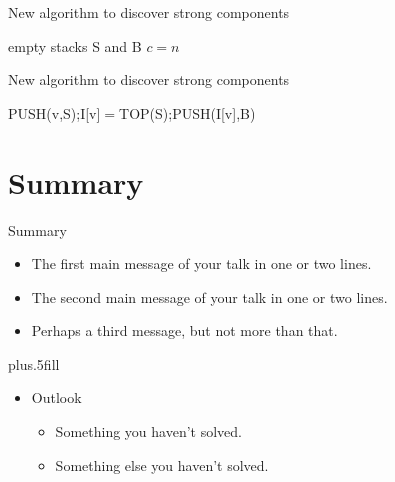\documentclass{beamer}
\begin{document}
\begin{frame}[fragile]{New algorithm to discover strong components}
	\begin{procedure}[H]
		\small
		\caption{STRONG(G)}
		empty stacks S and B\;
		$c=n$\;
	\end{procedure}
\end{frame}

\begin{frame}[fragile]{New algorithm to discover strong components}
	\begin{procedure}[H]
		\scriptsize
		\caption{DFS(v)}
		PUSH(v,S);\quad I[v]$=$TOP(S);\quad PUSH(I[v],B)\;
	\end{procedure}
\end{frame}

\section*{Summary}

\begin{frame}{Summary}

  \begin{itemize}
  \item
    The \alert{first main message} of your talk in one or two lines.
  \item
    The \alert{second main message} of your talk in one or two lines.
  \item
    Perhaps a \alert{third message}, but not more than that.
  \end{itemize}

  \vskip0pt plus.5fill
  \begin{itemize}
  \item
    Outlook
    \begin{itemize}
    \item
      Something you haven't solved.
    \item
      Something else you haven't solved.
    \end{itemize}
  \end{itemize}
\end{frame}
\end{document}
